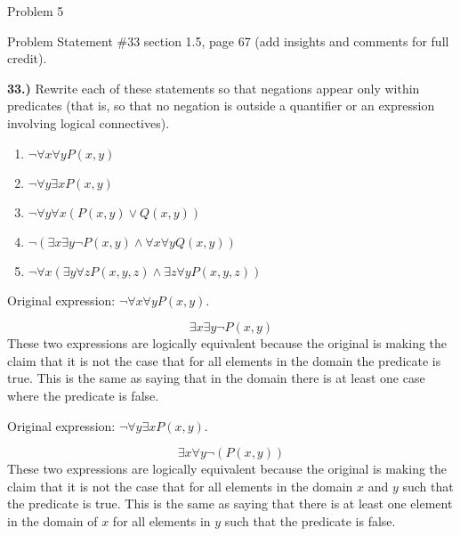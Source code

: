 \begin{problem}{Problem 5}
    \begin{statement}{Problem Statement}
        \#33 section 1.5, page 67 (add insights and comments for full credit). \vspace*{1em}

        \noindent \textbf{33.)} Rewrite each of these statements so that negations appear only within predicates (that is, so that no negation is outside a quantifier or an expression involving logical 
        connectives).

        \begin{enumerate}[label=(\alph*)]
            \item $\neg \forall x \forall y P(x,y)$
            \item $\neg \forall y \exists x P(x,y)$
            \item $\neg \forall y \forall x (P(x,y) \vee Q(x,y))$
            \item $\neg(\exists x \exists y \neg P(x,y) \wedge \forall x \forall y Q(x,y))$
            \item $\neg \forall x (\exists y \forall z P(x,y,z) \wedge \exists z \forall y P(x,y,z))$
        \end{enumerate}
    \end{statement}

    \begin{highlight}
        Original expression: $\neg \forall x \forall y P(x,y)$.

        \setcounter{equation}{0}
        \begin{equation}
            \exists x \exists y \neg P(x,y) 
        \end{equation}
        These two expressions are logically equivalent because the original is making the claim that it is not the case that for all elements in the domain the predicate is true. This is the same as saying that in 
        the domain there is at least one case where the predicate is false.
    \end{highlight}

    \begin{highlight}
        Original expression: $\neg \forall y \exists x P(x,y)$.

        \begin{equation}
            \exists x \forall y \neg (P(x,y))
        \end{equation}
        These two expressions are logically equivalent because the original is making the claim that it is not the case that for all elements in the domain $x$ and $y$ such that the predicate is true. This is the same 
        as saying that there is at least one element in the domain of $x$ for all elements in $y$ such that the predicate is false.
    \end{highlight}


\end{problem}
